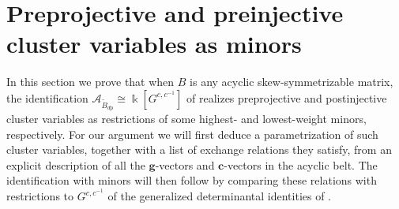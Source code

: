 \documentclass[12pt]{amsart}
\newcommand{\saySS}[1]{\say[SS]{\color{blue}{\bf SS:}\;#1}}
\newcommand{\cA}{\mathcal{A}}
\newcommand{\kk}{\Bbbk}%
\newcommand{\bfc}{\mathbf{c}}
\newcommand{\bfg}{\mathbf{g}}
\newcommand{\Bdp}{\widetilde{B}_{dp}}
\newtheorem{lemma}[theorem]{Lemma}
\theoremstyle{remark}
\numberwithin{equation}{section}
\numberwithin{figure}{section}
\begin{document}

\section{Preprojective and preinjective cluster variables as minors}
In this section we prove that when $B$ is any acyclic skew-symmetrizable matrix, the identification $\cA_{\Bdp} \cong \kk[G^{c,c^{-1}}]$ of  realizes preprojective and postinjective cluster variables as restrictions of some highest- and lowest-weight minors, respectively. 
For our argument we will first deduce a parametrization of such cluster variables, together with a list of exchange relations they satisfy, from an explicit description of all the $\bfg$-vectors and $\bfc$-vectors in the acyclic belt.
The identification with minors will then follow by comparing these relations with restrictions  to $G^{c,c^{-1}}$ of the generalized determinantal identities of .
\end{document}
